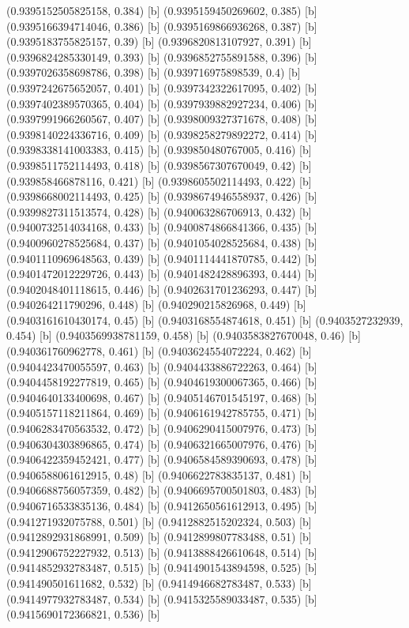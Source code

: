 {{{(0.9395152505825158, 0.384) [b] 
(0.9395159450269602, 0.385) [b] 
(0.9395166394714046, 0.386) [b] 
(0.9395169866936268, 0.387) [b] 
(0.9395183755825157, 0.39) [b] 
(0.9396820813107927, 0.391) [b] 
(0.9396824285330149, 0.393) [b] 
(0.9396852755891588, 0.396) [b] 
(0.9397026358698786, 0.398) [b] 
(0.939716975898539, 0.4) [b] 
(0.9397242675652057, 0.401) [b] 
(0.9397342322617095, 0.402) [b] 
(0.9397402389570365, 0.404) [b] 
(0.9397939882927234, 0.406) [b] 
(0.9397991966260567, 0.407) [b] 
(0.9398009327371678, 0.408) [b] 
(0.9398140224336716, 0.409) [b] 
(0.9398258279892272, 0.414) [b] 
(0.9398338141003383, 0.415) [b] 
(0.939850480767005, 0.416) [b] 
(0.9398511752114493, 0.418) [b] 
(0.9398567307670049, 0.42) [b] 
(0.939858466878116, 0.421) [b] 
(0.9398605502114493, 0.422) [b] 
(0.9398668002114493, 0.425) [b] 
(0.9398674946558937, 0.426) [b] 
(0.9399827311513574, 0.428) [b] 
(0.940063286706913, 0.432) [b] 
(0.9400732514034168, 0.433) [b] 
(0.9400874866841366, 0.435) [b] 
(0.9400960278525684, 0.437) [b] 
(0.9401054028525684, 0.438) [b] 
(0.9401110969648563, 0.439) [b] 
(0.9401114441870785, 0.442) [b] 
(0.9401472012229726, 0.443) [b] 
(0.9401482428896393, 0.444) [b] 
(0.9402048401118615, 0.446) [b] 
(0.9402631701236293, 0.447) [b] 
(0.940264211790296, 0.448) [b] 
(0.940290215826968, 0.449) [b] 
(0.9403161610430174, 0.45) [b] 
(0.9403168554874618, 0.451) [b] 
(0.9403527232939, 0.454) [b] 
(0.9403569938781159, 0.458) [b] 
(0.9403583827670048, 0.46) [b] 
(0.940361760962778, 0.461) [b] 
(0.9403624554072224, 0.462) [b] 
(0.9404423470055597, 0.463) [b] 
(0.9404433886722263, 0.464) [b] 
(0.9404458192277819, 0.465) [b] 
(0.9404619300067365, 0.466) [b] 
(0.9404640133400698, 0.467) [b] 
(0.9405146701545197, 0.468) [b] 
(0.9405157118211864, 0.469) [b] 
(0.9406161942785755, 0.471) [b] 
(0.9406283470563532, 0.472) [b] 
(0.9406290415007976, 0.473) [b] 
(0.9406304303896865, 0.474) [b] 
(0.9406321665007976, 0.476) [b] 
(0.9406422359452421, 0.477) [b] 
(0.9406584589390693, 0.478) [b] 
(0.9406588061612915, 0.48) [b] 
(0.9406622783835137, 0.481) [b] 
(0.9406688756057359, 0.482) [b] 
(0.9406695700501803, 0.483) [b] 
(0.9406716533835136, 0.484) [b] 
(0.9412650561612913, 0.495) [b] 
(0.941271932075788, 0.501) [b] 
(0.9412882515202324, 0.503) [b] 
(0.9412892931868991, 0.509) [b] 
(0.9412899807783488, 0.51) [b] 
(0.9412906752227932, 0.513) [b] 
(0.9413888426610648, 0.514) [b] 
(0.9414852932783487, 0.515) [b] 
(0.9414901543894598, 0.525) [b] 
(0.941490501611682, 0.532) [b] 
(0.9414946682783487, 0.533) [b] 
(0.9414977932783487, 0.534) [b] 
(0.9415325589033487, 0.535) [b] 
(0.9415690172366821, 0.536) [b] 
}}}

